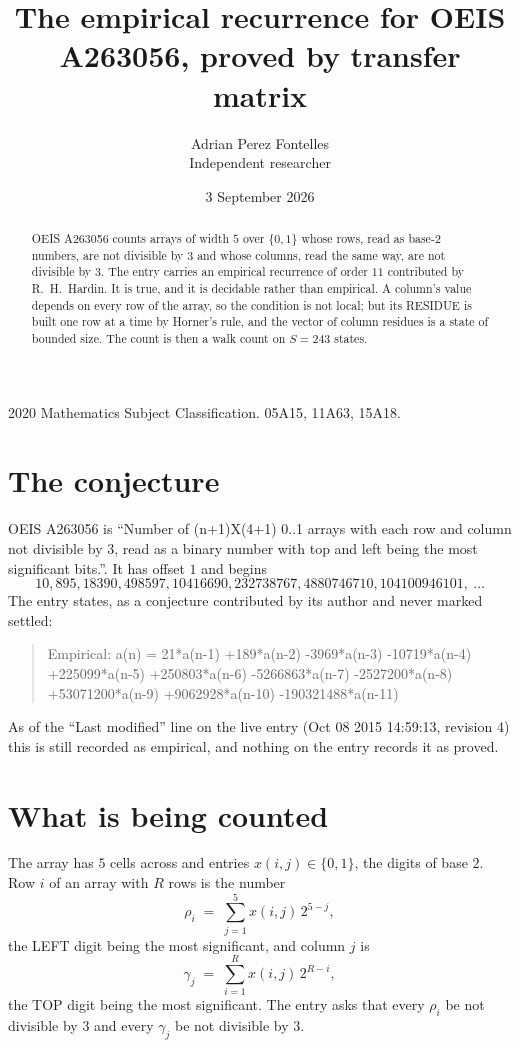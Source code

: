 \documentclass[11pt,a4paper]{article}
\title{The empirical recurrence for OEIS A263056, proved by transfer matrix}
\author{Adrian Perez Fontelles\\ \small Independent researcher}
\date{3 September 2026}
\theoremstyle{plain}
\theoremstyle{definition}
\begin{document}
\maketitle

\begin{abstract}
OEIS A263056 counts arrays of width $5$ over $\{0,1\}$ whose rows, read as base-$2$
numbers, are not divisible by $3$ and whose columns, read the same way, are not divisible by
$3$. The entry carries an empirical recurrence of order $11$ contributed by
R.~H.~Hardin. It is true, and it is decidable rather than empirical. A column's value depends on
every row of the array, so the condition is not local; but its RESIDUE is built one row at a
time by Horner's rule, and the vector of column residues is a state of bounded size. The count
is then a walk count on $S=243$ states.
\end{abstract}

\noindent\small 2020 Mathematics Subject Classification. 05A15, 11A63, 15A18.\normalsize

\section{The conjecture}

OEIS A263056 is ``Number of (n+1)X(4+1) 0..1 arrays with each row and column not divisible by 3, read as a binary number with top and left being the most significant bits.''. It has offset $1$ and begins
\[
10, 895, 18390, 498597, 10416690, 232738767, 4880746710, 104100946101,\ \dots
\]
The entry states, as a conjecture contributed by its author and never marked settled:
\begin{quote}
Empirical: a(n) = 21*a(n-1) +189*a(n-2) -3969*a(n-3) -10719*a(n-4) +225099*a(n-5) +250803*a(n-6) -5266863*a(n-7) -2527200*a(n-8) +53071200*a(n-9) +9062928*a(n-10) -190321488*a(n-11)
\end{quote}
As of the ``Last modified'' line on the live entry (Oct 08 2015 14:59:13, revision 4) this is still
recorded as empirical, and nothing on the entry records it as proved.

\section{What is being counted}

The array has $5$ cells across and entries $x(i,j)\in\{0,1\}$, the digits of
base $2$. Row $i$ of an array with $R$ rows is the number
\[
\rho_i\;=\;\sum_{j=1}^{5}x(i,j)\,2^{5-j} ,
\]
the LEFT digit being the most significant, and column $j$ is
\[
\gamma_j\;=\;\sum_{i=1}^{R}x(i,j)\,2^{R-i} ,
\]
the TOP digit being the most significant. The entry asks that every $\rho_i$ be not divisible by
$3$ and every $\gamma_j$ be not divisible by $3$.
\end{document}

